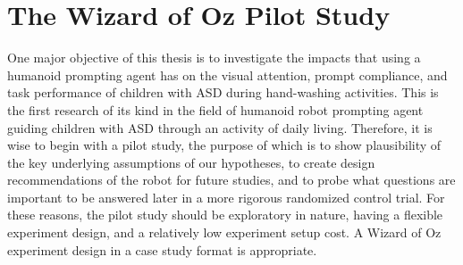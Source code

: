 \chapter{The Wizard of Oz Pilot Study}


One major objective of this thesis is to investigate the impacts that using a humanoid prompting agent has on the visual attention, prompt compliance, and task performance of children with ASD during hand-washing activities.  This is the first research of its kind in the field of humanoid robot prompting agent guiding children with ASD through an activity of daily living.  Therefore, it is wise to begin with a pilot study, the purpose of which is to show plausibility of the key underlying assumptions of our hypotheses, to create design recommendations of the robot for future studies, and to probe what questions are important to be answered later in a more rigorous randomized control trial.  For these reasons, the pilot study should be exploratory in nature, having a flexible experiment design, and a relatively low experiment setup cost.  A Wizard of Oz experiment design in a case study format is appropriate.














